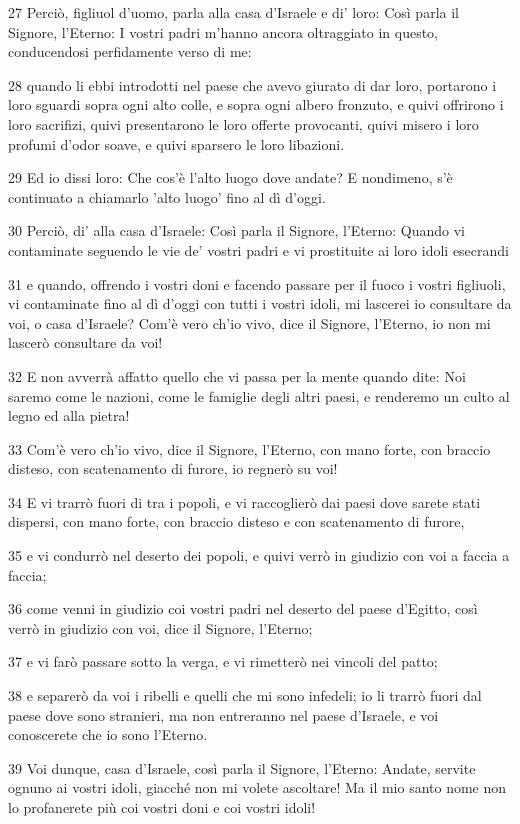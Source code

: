 \par 27 Perciò, figliuol d'uomo, parla alla casa d'Israele e di' loro: Così parla il Signore, l'Eterno: I vostri padri m'hanno ancora oltraggiato in questo, conducendosi perfidamente verso di me:
\par 28 quando li ebbi introdotti nel paese che avevo giurato di dar loro, portarono i loro sguardi sopra ogni alto colle, e sopra ogni albero fronzuto, e quivi offrirono i loro sacrifizi, quivi presentarono le loro offerte provocanti, quivi misero i loro profumi d'odor soave, e quivi sparsero le loro libazioni.
\par 29 Ed io dissi loro: Che cos'è l'alto luogo dove andate? E nondimeno, s'è continuato a chiamarlo 'alto luogo' fino al dì d'oggi.
\par 30 Perciò, di' alla casa d'Israele: Così parla il Signore, l'Eterno: Quando vi contaminate seguendo le vie de' vostri padri e vi prostituite ai loro idoli esecrandi
\par 31 e quando, offrendo i vostri doni e facendo passare per il fuoco i vostri figliuoli, vi contaminate fino al dì d'oggi con tutti i vostri idoli, mi lascerei io consultare da voi, o casa d'Israele? Com'è vero ch'io vivo, dice il Signore, l'Eterno, io non mi lascerò consultare da voi!
\par 32 E non avverrà affatto quello che vi passa per la mente quando dite: Noi saremo come le nazioni, come le famiglie degli altri paesi, e renderemo un culto al legno ed alla pietra!
\par 33 Com'è vero ch'io vivo, dice il Signore, l'Eterno, con mano forte, con braccio disteso, con scatenamento di furore, io regnerò su voi!
\par 34 E vi trarrò fuori di tra i popoli, e vi raccoglierò dai paesi dove sarete stati dispersi, con mano forte, con braccio disteso e con scatenamento di furore,
\par 35 e vi condurrò nel deserto dei popoli, e quivi verrò in giudizio con voi a faccia a faccia;
\par 36 come venni in giudizio coi vostri padri nel deserto del paese d'Egitto, così verrò in giudizio con voi, dice il Signore, l'Eterno;
\par 37 e vi farò passare sotto la verga, e vi rimetterò nei vincoli del patto;
\par 38 e separerò da voi i ribelli e quelli che mi sono infedeli; io li trarrò fuori dal paese dove sono stranieri, ma non entreranno nel paese d'Israele, e voi conoscerete che io sono l'Eterno.
\par 39 Voi dunque, casa d'Israele, così parla il Signore, l'Eterno: Andate, servite ognuno ai vostri idoli, giacché non mi volete ascoltare! Ma il mio santo nome non lo profanerete più coi vostri doni e coi vostri idoli!
